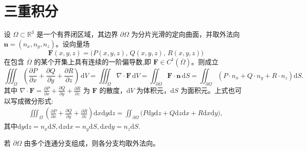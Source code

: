 \documentclass[../../main.tex]{subfiles}%
\begin{document}
\section{三重积分}

\begin{theorem}[Gauss公式]\label{theorem:Gauss公式--数分}
设 $\Omega \subset \mathbb{R}^3$ 是一个有界闭区域，其边界 $\partial\Omega$ 为分片光滑的定向曲面，并取外法向 $\bm{n}=(n_x,n_y,n_z)$。设向量场
\[
\bm{F}(x,y,z) = \bigl( P(x,y,z),\, Q(x,y,z),\, R(x,y,z) \bigr)
\]
在包含 $\overline{\Omega}$ 的某个开集上具有连续的一阶偏导数,即 $\bm{F}\in C^1(\overline{\Omega})$。则成立
\[
\iiint_{\Omega}{\left( \frac{\partial P}{\partial x}+\frac{\partial Q}{\partial y}+\frac{\partial R}{\partial z} \right) \,\mathrm{d}V}=\iiint_{\Omega}{\nabla \cdot \boldsymbol{F}\,\mathrm{d}V}=\iint_{\partial \Omega}{\boldsymbol{F}\cdot \boldsymbol{n}\,\mathrm{d}S}=\iint_{\partial \Omega}{\left( P\cdot n_x+Q\cdot n_y+R\cdot n_z \right) \mathrm{d}S}.
\]
其中 $\nabla \cdot \bm{F}= \frac{\partial P}{\partial x} + \frac{\partial Q}{\partial y} + \frac{\partial R}{\partial z}$ 为 $\bm{F}$ 的散度，$\mathrm{d}V$ 为体积元，$\mathrm{d}S$ 为面积元。上式也可以写成微分形式:
\begin{align*}
\iiint_{\Omega}{\left( \frac{\partial P}{\partial x}+\frac{\partial Q}{\partial y}+\frac{\partial R}{\partial z} \right) \mathrm{d}x\mathrm{d}y\mathrm{d}z}=\iint_{\partial \Omega}{\bigl( P\mathrm{d}y\mathrm{d}z+Q\mathrm{d}z\mathrm{d}x+R\mathrm{d}x\mathrm{d}y \bigr)},
\end{align*}
其中$\mathrm{d}y\mathrm{d}z=n_x\mathrm{d}S,  \mathrm{d}z\mathrm{d}x=n_y\mathrm{d}S,  \mathrm{d}x\mathrm{d}y=n_z\mathrm{d}S$.
\end{theorem}
\begin{remark}
若 $\partial\Omega$ 由多个连通分支组成，则各分支均取外法向。
\end{remark}
\end{document}
